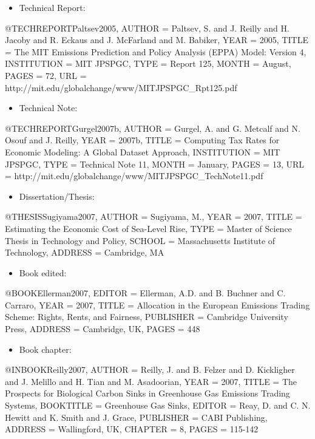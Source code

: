 \documentclass[12pt,fleqn]{article}
\let\oldverbatim\verbatim
\let\oldendverbatim\endverbatim
\renewenvironment{verbatim}{\endgraf\footnotesize\singlespace\oldverbatim}{\oldendverbatim\endsinglespace}
\begin{document}
\begin{itemize}
\item Technical Report:
\end{itemize}
\begin{verbatim}
@TECHREPORT{Paltsev2005,
  AUTHOR = {Paltsev, S. and J. Reilly and H. Jacoby and R. Eckaus and
  J. McFarland and M. Babiker},
  YEAR = {2005},
  TITLE = {The MIT Emissions Prediction and Policy Analysis (EPPA) Model:
  Version 4},
  INSTITUTION = {MIT JPSPGC},
  TYPE = {Report 125},
  MONTH = {August},
  PAGES = {72},
  URL = {http://mit.edu/globalchange/www/MITJPSPGC_Rpt125.pdf}}
\end{verbatim}

\begin{itemize}
\item Technical Note:
\end{itemize}
\begin{verbatim}
@TECHREPORT{Gurgel2007b,
  AUTHOR = {Gurgel, A. and G. Metcalf and N. Osouf and J. Reilly},
  YEAR = {2007b},
  TITLE = {Computing Tax Rates for Economic Modeling: A Global Dataset Approach},
  INSTITUTION = {MIT JPSPGC},
  TYPE = {Technical Note 11},
  MONTH = {January},
  PAGES = {13},
  URL = {http://mit.edu/globalchange/www/MITJPSPGC_TechNote11.pdf}}
\end{verbatim}

\begin{itemize}
\item Dissertation/Thesis:
\end{itemize}
\begin{verbatim}
@THESIS{Sugiyama2007,
  AUTHOR = {Sugiyama, M.},
  YEAR = {2007},
  TITLE = {Estimating the Economic Cost of Sea-Level Rise},
  TYPE = {Master of Science Thesis in Technology and Policy},
  SCHOOL = {Massachusetts Institute of Technology},
  ADDRESS = {Cambridge, MA}}
\end{verbatim}

\begin{itemize}
\item Book edited:
\end{itemize}
\begin{verbatim}
@BOOK{Ellerman2007,
  EDITOR = {Ellerman, A.D. and B. Buchner and C. Carraro},
  YEAR = {2007},
  TITLE = {Allocation in the European Emissions Trading Scheme: Rights, Rents,
  and Fairness},
  PUBLISHER = {Cambridge University Press},
  ADDRESS = {Cambridge, UK},
  PAGES = {448}}
\end{verbatim}

\begin{itemize}
\item Book chapter:
\end{itemize}
\begin{verbatim}
@INBOOK{Reilly2007,
  AUTHOR = {Reilly, J. and B. Felzer and D. Kickligher and J. Melillo and H. Tian
  and M. Asadoorian},
  YEAR = {2007},
  TITLE = {The Prospects for Biological Carbon Sinks in Greenhouse Gas Emissions
  Trading Systems},
  BOOKTITLE = {Greenhouse Gas Sinks},
  EDITOR = {Reay, D. and C. N. Hewitt and K. Smith and J. Grace},
  PUBLISHER = {CABI Publishing},
  ADDRESS = {Wallingford, UK},
  CHAPTER = {8},
  PAGES = {115-142}}
\end{verbatim}
\end{document}
